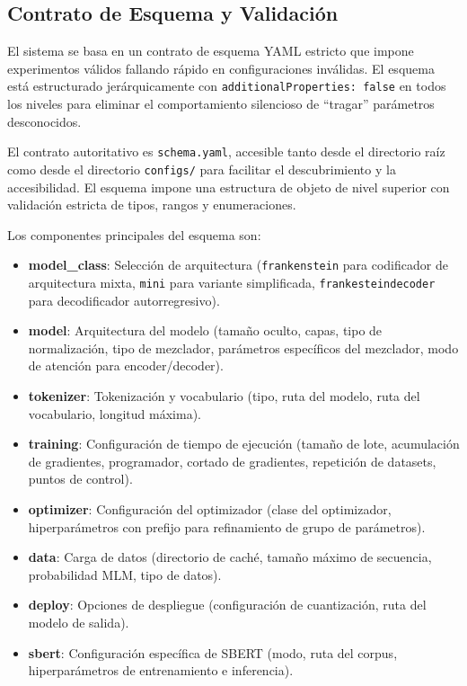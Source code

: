 \documentclass[11pt,a4paper]{article}
\begin{document}
\subsection{Contrato de Esquema y Validación}
\label{sec:config-centric-architecture}

El sistema se basa en un contrato de esquema YAML estricto que impone experimentos válidos fallando rápido en configuraciones inválidas. El esquema está estructurado jerárquicamente con \texttt{additionalProperties: false} en todos los niveles para eliminar el comportamiento silencioso de ``tragar'' parámetros desconocidos.

El contrato autoritativo es \texttt{schema.yaml}, accesible tanto desde el directorio raíz como desde el directorio \texttt{configs/} para facilitar el descubrimiento y la accesibilidad. El esquema impone una estructura de objeto de nivel superior con validación estricta de tipos, rangos y enumeraciones.

Los componentes principales del esquema son:
\begin{itemize}[leftmargin=*]
    \item \textbf{model\_class}: Selección de arquitectura (\texttt{frankenstein} para codificador de arquitectura mixta, \texttt{mini} para variante simplificada, \texttt{frankesteindecoder} para decodificador autorregresivo).
    \item \textbf{model}: Arquitectura del modelo (tamaño oculto, capas, tipo de normalización, tipo de mezclador, parámetros específicos del mezclador, modo de atención para encoder/decoder).
    \item \textbf{tokenizer}: Tokenización y vocabulario (tipo, ruta del modelo, ruta del vocabulario, longitud máxima).
    \item \textbf{training}: Configuración de tiempo de ejecución (tamaño de lote, acumulación de gradientes, programador, cortado de gradientes, repetición de datasets, puntos de control).
    \item \textbf{optimizer}: Configuración del optimizador (clase del optimizador, hiperparámetros con prefijo para refinamiento de grupo de parámetros).
    \item \textbf{data}: Carga de datos (directorio de caché, tamaño máximo de secuencia, probabilidad MLM, tipo de datos).
    \item \textbf{deploy}: Opciones de despliegue (configuración de cuantización, ruta del modelo de salida).
    \item \textbf{sbert}: Configuración específica de SBERT (modo, ruta del corpus, hiperparámetros de entrenamiento e inferencia).
\end{itemize}
\end{document}
